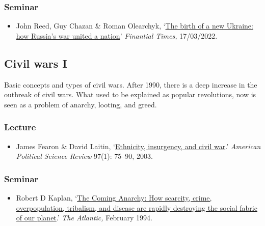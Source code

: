 \documentclass[12pt, a4paper]{article}
\begin{document}
\subsubsection*{Seminar}

\begin{itemize}
\setlength\itemsep{0pt}
\item John Reed, Guy Chazan \& Roman Olearchyk, `\href{https://www.ft.com/content/9ab50dee-67f5-4e1b-8456-d8f11814ef18}{The birth of a new Ukraine: how Russia's war united a nation}' \textit{Finantial Times,} 17/03/2022.
\end{itemize}


\hline %

\subsection{Civil wars I}\label{cw1}

Basic concepts and types of civil wars. After 1990, there is a deep increase in the outbreak of civil wars. What used to be explained as popular revolutions, now is seen as a problem of anarchy, looting, and greed.

\subsubsection*{Lecture}

\begin{itemize}
\setlength\itemsep{0pt}
\item James Fearon \& David Laitin, `\href{https://doi.org/10.1017/S0003055403000534}{Ethnicity, insurgency, and civil war}.' \textit{American Political Science Review} 97(1): 75--90, 2003.
\end{itemize}

\subsubsection*{Seminar}

\begin{itemize}
\setlength\itemsep{-5pt}
\item Robert D Kaplan, `\href{https://www.theatlantic.com/magazine/archive/1994/02/the-coming-anarchy/304670/}{The Coming Anarchy: How scarcity, crime, overpopulation, tribalism, and disease are rapidly destroying the social fabric of our planet}.' \textit{The Atlantic,} February 1994.
\end{itemize}
\end{document}
